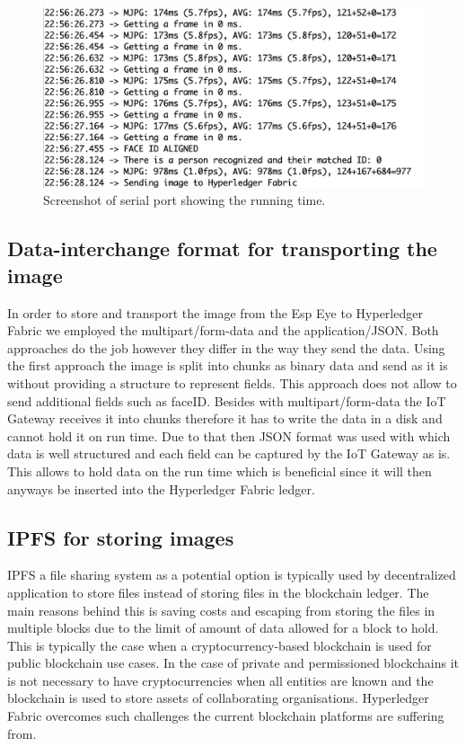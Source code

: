 \begin{figure}[!htb]
    \centering
    \includegraphics[width=1\textwidth]{figures/time_facedetection.png}
    \caption{Screenshot of serial port showing the running time.}
    \label{fig:time_face}
\end{figure}




\subsection{Data-interchange format for transporting the image }

In order to store and transport the image from the Esp Eye to Hyperledger Fabric we employed the multipart/form-data and the application/JSON. Both approaches do the job however they differ in the way they send the data. Using the first approach the image is split into chunks as binary data and send as it is without providing a structure to represent fields. This approach does not allow to send additional fields such as faceID. Besides with multipart/form-data the IoT Gateway receives it into chunks therefore it has to write the data in a disk and cannot hold it on run time. Due to that then JSON format was used with which data is well structured and each field can be captured by the IoT Gateway as is. This allows to hold data on the run time which is beneficial since it will then anyways be inserted into the Hyperledger Fabric ledger.  

\subsection{IPFS for storing images}

IPFS a file sharing system as a potential option is typically used by decentralized application to store files instead of storing files in the blockchain ledger. The main reasons behind this is saving costs and escaping from storing the files in multiple blocks due to the limit of amount of data allowed for a block to hold.  This is typically the case when a cryptocurrency-based blockchain is used for public blockchain use cases. In the case of private and permissioned blockchains it is not necessary to have cryptocurrencies when all entities are known and the blockchain is used to store assets of collaborating organisations. Hyperledger Fabric overcomes such challenges the current blockchain platforms are suffering from. 

